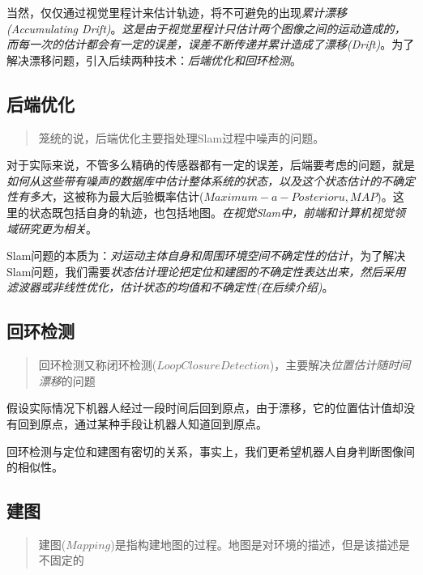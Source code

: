     当然，仅仅通过视觉里程计来估计轨迹，将不可避免的出现\emph{累计漂移(Accumulating Drift)}。\emph{这是由于视觉里程计只估计两个图像之间的运动造成的，而每一次的估计都会有一定的误差，误差不断传递并累计造成了漂移(Drift)}。为了解决漂移问题，引入后续两种技术：\emph{后端优化和回环检测}。

\subsection{后端优化}

\begin{quote}
    \centering
    笼统的说，后端优化主要指处理Slam过程中噪声的问题。
\end{quote}

    对于实际来说，不管多么精确的传感器都有一定的误差，后端要考虑的问题，就是\emph{如何从这些带有噪声的数据库中估计整体系统的状态，以及这个状态估计的不确定性有多大}，这被称为最大后验概率估计($Maximum-a-Posterioru, MAP$)。这里的状态既包括自身的轨迹，也包括地图。\emph{在视觉Slam中，前端和计算机视觉领域研究更为相关}。
    
    Slam问题的本质为：\emph{对运动主体自身和周围环境空间不确定性的估计}，为了解决Slam问题，我们需要\emph{状态估计理论把定位和建图的不确定性表达出来，然后采用滤波器或非线性优化，估计状态的均值和不确定性(在后续介绍)}。

\subsection{回环检测}

\begin{quote}
    \centering
    回环检测又称闭环检测($Loop Closure Detection$)，主要解决\emph{位置估计随时间漂移}的问题
\end{quote}

    假设实际情况下机器人经过一段时间后回到原点，由于漂移，它的位置估计值却没有回到原点，通过某种手段让机器人知道回到原点。
    
    回环检测与定位和建图有密切的关系，事实上，我们更希望机器人自身判断图像间的相似性。

\subsection{建图}

\begin{quote}
    \centering
    建图($Mapping$)是指构建地图的过程。地图是对环境的描述，但是该描述是不固定的
\end{quote}

